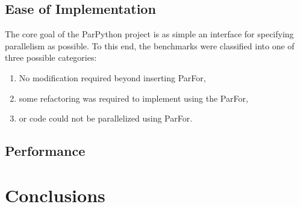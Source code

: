 \documentclass[conference]{IEEEtran}
\begin{document}
\subsection{Ease of Implementation}

The core goal of the ParPython project is as simple an interface for specifying parallelism as possible. To this end, 
the benchmarks were classified into one of three possible categories:
\begin{enumerate}
   \item No modification required beyond inserting ParFor,
   \item some refactoring was required to implement using the ParFor,
   \item or code could not be parallelized using ParFor.
\end{enumerate}




\subsection{Performance}









\section{Conclusions}




\end{document}
